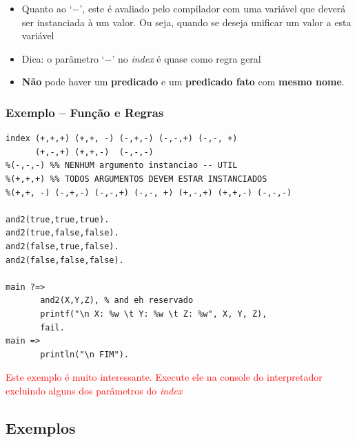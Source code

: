\begin{frame}[c,allowframebreaks=0.6,fragile]
\begin{itemize}
        
        \item Quanto ao `$-$', este é avaliado pelo compilador com uma variável que deverá ser 
        instanciada à um valor. Ou seja, quando se deseja unificar um valor a esta variável
        
        \item Dica: o parâmetro `$-$' no \textit{index} é quase como regra geral
                
        \item \textbf{Não} pode haver um \textbf{predicado} e um \textbf{predicado 
        fato} com \textbf{mesmo nome}.
        
    \end{itemize}
\end{frame}



\begin{frame} [fragile]
\frametitle{Exemplo -- Função e Regras}

\begin{footnotesize}
\begin{verbatim}
index (+,+,+) (+,+, -) (-,+,-) (-,-,+) (-,-, +) 
      (+,-,+) (+,+,-)  (-,-,-)
%(-,-,-) %% NENHUM argumento instanciao -- UTIL
%(+,+,+) %% TODOS ARGUMENTOS DEVEM ESTAR INSTANCIADOS
%(+,+, -) (-,+,-) (-,-,+) (-,-, +) (+,-,+) (+,+,-) (-,-,-)

and2(true,true,true).
and2(true,false,false).
and2(false,true,false).
and2(false,false,false).

main ?=>
       and2(X,Y,Z), % and eh reservado
       printf("\n X: %w \t Y: %w \t Z: %w", X, Y, Z),
       fail.
main =>       
       println("\n FIM"). 
\end{verbatim}
\end{footnotesize}

\textcolor{red}{Este exemplo é muito interessante. Execute ele na console do interpretador
excluindo alguns dos parâmetros do \textit{index}}

\end{frame}





\subsection{Exemplos}

